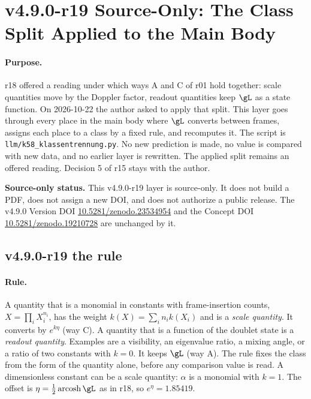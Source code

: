 \clearpage
\section*{v4.9.0-r19 Source-Only: The Class Split Applied to the Main Body}
\label{sec:v490-r19-class-split-applied}

\paragraph{Purpose.}
r18 offered a reading under which ways A and C of r01 hold together: scale quantities move by the Doppler factor, readout
quantities keep \(\gL\) as a state function.  On 2026-10-22 the author asked to apply that split.  This layer goes through every
place in the main body where \(\gL\) converts between frames, assigns each place to a class by a fixed rule, and recomputes it.
The script is \texttt{llm/k58\_klassentrennung.py}.  No new prediction is made, no value is compared with new data, and no
earlier layer is rewritten.  The applied split remains an offered reading.  Decision 5 of r15 stays with the author.

\noindent\textbf{Source-only status.}
This v4.9.0-r19 layer is source-only.  It does not build a PDF, does not assign a new DOI,
and does not authorize a public release.  The v4.9.0 Version DOI
\href{https://doi.org/10.5281/zenodo.23534954}{10.5281/zenodo.23534954} and the Concept DOI
\href{https://doi.org/10.5281/zenodo.19210728}{10.5281/zenodo.19210728} are unchanged by it.

\subsection*{v4.9.0-r19 the rule}
\label{subsec:v490-r19-rule}

\paragraph{Rule.}
A quantity that is a monomial in constants with frame-insertion counts, \(X=\prod_iX_i^{n_i}\), has the weight
\(k(X)=\sum_in_ik(X_i)\) and is a \emph{scale quantity}.  It converts by \(e^{k\eta}\) (way C).  A quantity that is a function of
the doublet state is a \emph{readout quantity}.  Examples are a visibility, an eigenvalue ratio, a mixing angle, or a ratio of
two constants with \(k=0\).  It keeps \(\gL\) (way A).  The rule fixes the class from the form of the quantity alone, before any
comparison value is read.  A dimensionless constant can be a scale quantity: \(\alpha\) is a monomial with \(k=1\).  The offset is
\(\eta=\tfrac12\operatorname{arcosh}\gL\) as in r18, so \(e^\eta=1.85419\).

